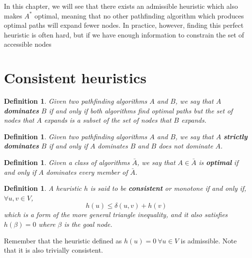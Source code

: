 \documentclass[12pt]{report}
\newtheorem{definition}[theorem]{Definition}
\begin{document}
In this chapter, we will see that there exists an admissible heuristic which also makes $A^*$ optimal, meaning that no other pathfinding algorithm which produces optimal paths will expand fewer nodes. In practice, however, finding this perfect heuristic is often hard, but if we have enough information to constrain the set of accessible nodes 

\section{Consistent heuristics}

\begin{definition}
Given two pathfinding algorithms $A$ and $B$, we say that $A$ \textbf{dominates} $B$ if and only if both algorithms find optimal paths but the set of nodes that $A$ expands is a subset of the set of nodes that $B$ expands.
\end{definition}

\begin{definition}
Given two pathfinding algorithms $A$ and $B$, we say that $A$ \textbf{strictly dominates} $B$ if and only if $A$ dominates $B$ and $B$ does not dominate $A$.
\end{definition}

\begin{definition}
Given a class of algorithms $\bar{A}$, we say that $A \in \bar{A}$ is \textbf{optimal} if and only if $A$ dominates every member of $\bar{A}$.
\end{definition}

\begin{definition}
A heuristic $h$ is said to be \textbf{consistent} or monotone if and only if, $\forall u, v \in V$,
\begin{equation}
	h(u) \leq \delta(u, v) + h(v)\label{eq:consistency}
\end{equation}
which is a form of the more general triangle inequality, and it also satisfies $h(\beta) = 0$ where $\beta$ is the goal node.
\end{definition}

Remember that the heuristic defined as $h(u) = 0 \  \forall u \in V$ is admissible. Note that it is also trivially consistent.
\end{document}
